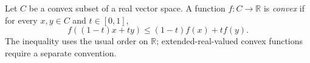 
Let $C$ be a convex subset of a real vector space. A function $f:C\to\mathbb R$ is \emph{convex} if for every $x,y\in C$ and $t\in[0,1]$,
\[
f((1-t)x+ty)\le(1-t)f(x)+tf(y).
\]
The inequality uses the usual order on $\mathbb R$; extended-real-valued convex functions require a separate convention.
